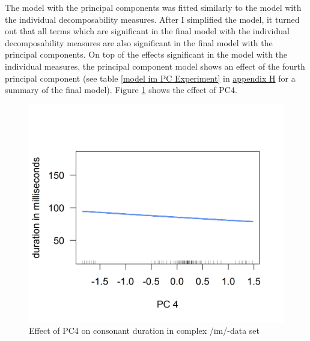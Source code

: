 The model with the principal components was fitted similarly to the model with the individual decomposability measures. After I simplified the model, it turned out that all terms which are significant in the final model with the individual decomposability measures are also significant in the final model with the principal components. On top of the effects significant in the model with the individual measures, the principal component model shows an effect of the fourth principal component (see table \ref{model im PC Experiment} in \hyperref[Appendix H: Model Summaries Experiment]{appendix H} for a summary of the final model). Figure \ref{fig:PC 4 imComplex experiment} shows the effect of \textsc{PC4}.

\begin{figure} [h!]
	\centering

	\includegraphics [scale=0.5] {images/Experiment/imModelPC}
	\caption{Effect of PC4 on consonant duration in complex /ɪm/-data set}
	\label{fig:PC 4 imComplex experiment}

\end{figure}



